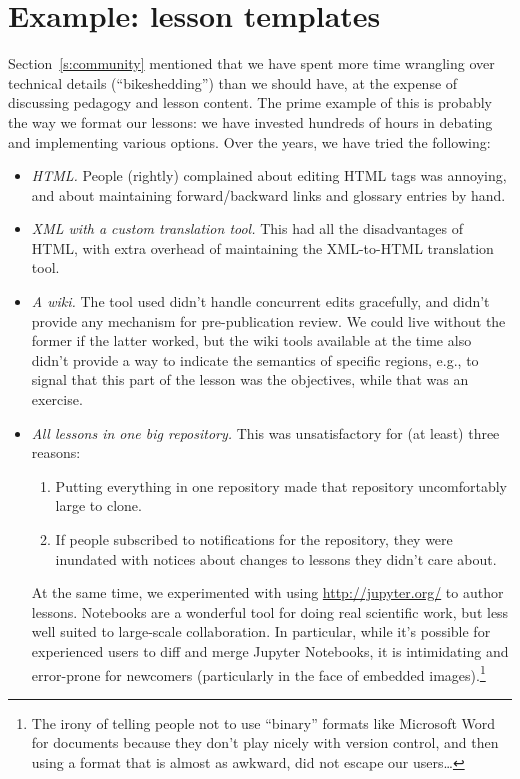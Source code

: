 \documentclass[10pt,a4paper,twocolumn]{article}
\begin{document}
\section{Example: lesson templates}\label{s:lesson-templates}

Section~\ref{s:community} mentioned that we have spent more time
wrangling over technical details (``bikeshedding'') than we should
have, at the expense of discussing pedagogy and lesson content.  The
prime example of this is probably the way we format our lessons: we
have invested hundreds of hours in debating and implementing various
options.  Over the years, we have tried the following:

\begin{itemize}

\item \emph{HTML.}  People (rightly) complained about editing HTML
  tags was annoying, and about maintaining forward/backward links and
  glossary entries by hand.

\item \emph{XML with a custom translation tool.}  This had all the
  disadvantages of HTML, with extra overhead of maintaining the
  XML-to-HTML translation tool.

\item \emph{A wiki.} The tool used didn't handle concurrent edits
  gracefully, and didn't provide any mechanism for pre-publication
  review.  We could live without the former if the latter worked, but
  the wiki tools available at the time also didn't provide a way to
  indicate the semantics of specific regions, e.g., to signal that
  this part of the lesson was the objectives, while that was an
  exercise.

\item \emph{All lessons in one big repository.}  This was
  unsatisfactory for (at least) three reasons:

  \begin{enumerate}

  \item Putting everything in one repository made that repository
    uncomfortably large to clone.

  \item If people subscribed to notifications for the repository, they
    were inundated with notices about changes to lessons they didn't
    care about.

  \end{enumerate}

  At the same time, we experimented with using \href{Jupyter
  Notebooks}{http://jupyter.org/} to author lessons.  Notebooks are
  a wonderful tool for doing real scientific work, but less well
  suited to large-scale collaboration.  In particular, while it's
  possible for experienced users to diff and merge Jupyter Notebooks,
  it is intimidating and error-prone for newcomers (particularly in
  the face of embedded images).\footnote{The irony of telling people
    not to use ``binary'' formats like Microsoft Word for documents
    because they don't play nicely with version control, and then
    using a format that is almost as awkward, did not escape our
    users{\ldots}}



\end{itemize}
\end{document}
